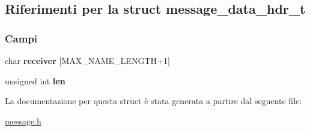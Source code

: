 \hypertarget{structmessage__data__hdr__t}{}\subsection{Riferimenti per la struct message\+\_\+data\+\_\+hdr\+\_\+t}
\label{structmessage__data__hdr__t}
\subsubsection*{Campi}
\begin{DoxyCompactItemize}
\item 
\mbox{\label{structmessage__data__hdr__t_af6c7df81f506cf337ac5e7948fc3a665}} 
char {\bfseries receiver} \mbox{[}M\+A\+X\+\_\+\+N\+A\+M\+E\+\_\+\+L\+E\+N\+G\+TH+1\mbox{]}
\item 
\mbox{\label{structmessage__data__hdr__t_a4b5503aa5aa13262ce9a702f61176579}} 
unsigned int {\bfseries len}
\end{DoxyCompactItemize}


La documentazione per questa struct è stata generata a partire dal seguente file\+:\begin{DoxyCompactItemize}
\item 
\mbox{\hyperlink{message_8h}{message.\+h}}\end{DoxyCompactItemize}
